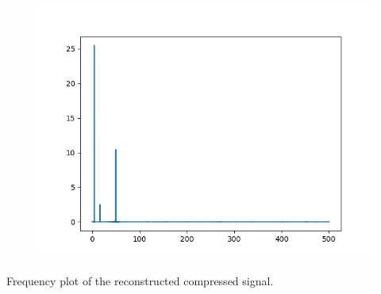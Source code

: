 \documentclass{article}
\begin{document}
\begin{figure}[H]
    \includegraphics[width=\textwidth]{4f.png}
\end{figure}
Frequency plot of the reconstructed compressed signal.
\end{document}
